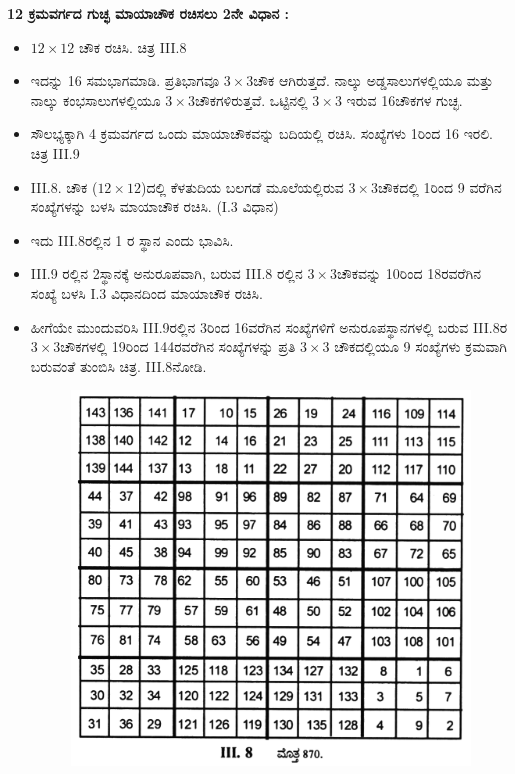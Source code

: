 \textbf{12 ಕ್ರಮವರ್ಗದ ಗುಚ್ಛ ಮಾಯಾಚೌಕ ರಚಿಸಲು 2ನೇ ವಿಧಾನ :}
\begin{itemize}
	\item $12 \times 12$ ಚೌಕ ರಚಿಸಿ. ಚಿತ್ರ  III.8
	\item ಇದನ್ನು 16 ಸಮಭಾಗಮಾಡಿ. ಪ್ರತಿಭಾಗವೂ $3 \times 3$ಚೌಕ ಆಗಿರುತ್ತದೆ. ನಾಲ್ಕು ಅಡ್ಡಸಾಲುಗಳಲ್ಲಿಯೂ ಮತ್ತು ನಾಲ್ಕು ಕಂಭಸಾಲುಗಳಲ್ಲಿಯೂ $3 \times 3$ಚೌಕಗಳಿರುತ್ತವೆ. ಒಟ್ಟಿನಲ್ಲಿ $3 \times 3$ ಇರುವ 16ಚೌಕಗಳ ಗುಚ್ಛ.
	\item ಸೌಲಭ್ಯಕ್ಕಾಗಿ 4 ಕ್ರಮವರ್ಗದ ಒಂದು ಮಾಯಾಚೌಕವನ್ನು ಬದಿಯಲ್ಲಿ ರಚಿಸಿ. ಸಂಖ್ಯೆಗಳು 1ರಿಂದ 16 ಇರಲಿ. ಚಿತ್ರ  III.9
	\item III.8. ಚೌಕ ($12 \times 12$)ದಲ್ಲಿ ಕೆಳತುದಿಯ ಬಲಗಡೆ ಮೂಲೆಯಲ್ಲಿರುವ $3 \times 3$ಚೌಕದಲ್ಲಿ 1ರಿಂದ 9 ವರೆಗಿನ ಸಂಖ್ಯೆಗಳನ್ನು ಬಳಸಿ ಮಾಯಾಚೌಕ ರಚಿಸಿ. (I.3 ವಿಧಾನ)
	\item ಇದು  III.8ರಲ್ಲಿನ 1 ರ ಸ್ಥಾನ ಎಂದು ಭಾವಿಸಿ.
	\item  III.9 ರಲ್ಲಿನ 2ಸ್ಥಾನಕ್ಕೆ ಅನುರೂಪವಾಗಿ, ಬರುವ  III.8 ರಲ್ಲಿನ $3 \times 3$ಚೌಕವನ್ನು 10ರಿಂದ 18ರವರೆಗಿನ ಸಂಖ್ಯೆ ಬಳಸಿ I.3 ವಿಧಾನದಿಂದ ಮಾಯಾಚೌಕ ರಚಿಸಿ.

	\item ಹೀಗೆಯೇ ಮುಂದುವರಿಸಿ  III.9ರಲ್ಲಿನ 3ರಿಂದ 16ವರೆಗಿನ ಸಂಖ್ಯೆಗಳಿಗೆ ಅನುರೂಪಸ್ಥಾನಗಳಲ್ಲಿ ಬರುವ  III.8ರ $3 \times 3$ಚೌಕಗಳಲ್ಲಿ 19ರಿಂದ 144ರವರೆಗಿನ ಸಂಖ್ಯೆಗಳನ್ನು ಪ್ರತಿ $3 \times 3$ ಚೌಕದಲ್ಲಿಯೂ 9 ಸಂಖ್ಯೆಗಳು ಕ್ರಮವಾಗಿ ಬರುವಂತೆ ತುಂಬಿಸಿ ಚಿತ್ರ. III.8ನೋಡಿ.
	\begin{figure}[h]
	\includegraphics{src/figures/chap3/fig3.35.jpg}
	\end{figure}


\end{itemize}
